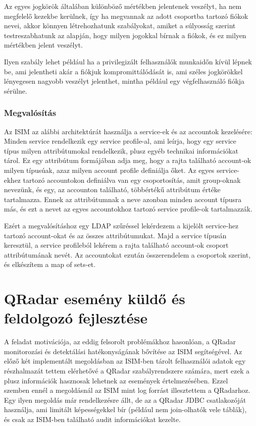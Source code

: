 		Az egyes jogkörök általában különböző mértékben jelentenek veszélyt, ha nem megfelelő kezekbe kerülnek, így ha megvannak az adott csoportba tartozó fiókok nevei, akkor könnyen létrehozhatunk szabályokat, amiket a súlyosság szerint testreszabhatunk az alapján, hogy milyen jogokkal bírnak a fiókok, és ez milyen mértékben jelent veszélyt.
		 
		Ilyen szabály lehet például ha a privilegizált felhasználók munkaidőn kívül lépnek be, ami jelentheti akár a fiókjuk kompromittálódását is, ami széles jogkörökkel lényegesen nagyobb veszélyt jelenthet, mintha például egy végfelhasználó fiókja sérülne.
		
	\subsubsection{Megvalósítás}

		Az ISIM az alábbi architektúrát használja a service-ek és az accountok kezelésére: Minden service rendelkezik egy service profile-al, ami leírja, hogy egy service típus milyen attribútumokal rendelkezik, plusz egyéb technikai információkat tárol. Ez egy attribútum formájában adja meg, hogy a rajta található account-ok milyen típusúak, azaz milyen account profile definiálja őket. Az egyes service-ekhez tartozó accountokon definiálva van egy csoportosítás, amit group-oknak nevezünk, és egy, az accounton található, többértékű attribútum értéke tartalmazza. Ennek az attribútumnak a neve azonban minden account típusra más, és ezt a nevet az egyes accountokhoz tartozó service profile-ok tartalmazzák.
		
		Ezért a megvalósításhoz egy LDAP szűréssel lekérdezem a kijelölt service-hez tartozó account-okat és az összes attribútumukat. Majd a service típusán keresztül, a service profileból lekérem a rajta található account-ok csoport attribútumának nevét. Az accountokat ezután összerendelem a csoportok szerint, és elkészítem a map of sets-et.
	
	
\section{QRadar esemény küldő és feldolgozó fejlesztése}
A feladat motivációja, az eddig felsorolt problémákhoz hasonlóan, a QRadar monitorozási és detektálási hatékonyságának bővítése az ISIM segítségével. Az előző két implementált megoldásban az ISIM-ben tárolt felhasználói adatok egy részhalmazát tettem elérhetővé a QRadar szabályrendszere számára, mert ezek a plusz információk hasznosak lehetnek az események értelmezésében. Ezzel szemben ennél a megoldásnál az ISIM mint log forrást illesztettem a QRadarhoz. Egy ilyen megoldás már rendelkezésre állt, de az a QRadar JDBC csatlakozóját használja, ami limitált képességekkel bír (például nem join-olhatók vele táblák), és csak az ISIM-ben található audit információkat kezelte.

